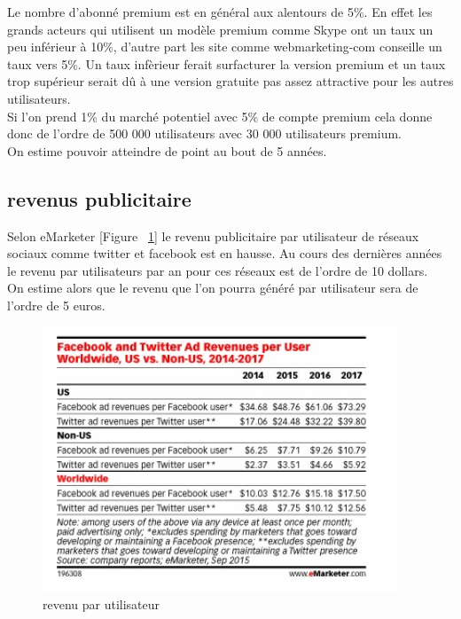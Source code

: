 \documentclass[a4,12pt]{article}
\begin{document}
Le nombre d'abonné premium est en général aux alentours de 5\%. En effet les grands acteurs qui utilisent un modèle premium comme Skype ont un taux un peu inférieur à 10\%, d'autre part les site comme webmarketing-com conseille un taux vers 5\%. Un taux infèrieur ferait surfacturer la version premium et un taux trop supérieur serait dû à une version gratuite pas assez attractive pour les autres utilisateurs.\\

Si l'on prend 1\% du marché potentiel avec 5\% de compte premium cela donne donc de l'ordre de 500 000 utilisateurs avec 30 000 utilisateurs premium.\\
On estime pouvoir atteindre de point au bout de 5 années.\\

\subsection{revenus publicitaire}

Selon eMarketer [Figure ~\ref{fig:revenu_par_utilisateur}] le revenu publicitaire par utilisateur de réseaux sociaux comme twitter et facebook est en hausse. Au cours des dernières années le revenu par utilisateurs par an pour ces réseaux est de l'ordre de 10 dollars.\\

On estime alors que le revenu que l'on pourra généré par utilisateur sera de l'ordre de 5 euros.

\begin{figure}[!h]
    \centering
    \includegraphics[width=300pt]{revenu_par_utilisateur.png}
    \caption{revenu par utilisateur}
    \label{fig:revenu_par_utilisateur}
\end{figure}
\end{document}
